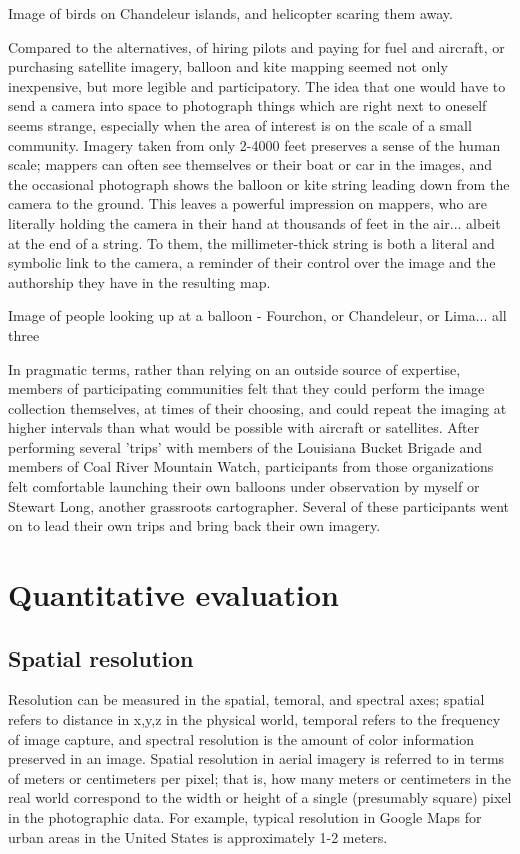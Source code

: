 \documentclass[11pt]{report}
\begin{document}
Image of birds on Chandeleur islands, and helicopter scaring them away.  

Compared to the alternatives, of hiring pilots and paying for fuel and aircraft, or purchasing satellite imagery, balloon and kite mapping seemed not only inexpensive, but more legible and participatory. The idea that one would have to send a camera into space to photograph things which are right next to oneself seems strange, especially when the area of interest is on the scale of a small community. Imagery taken from only 2-4000 feet preserves a sense of the human scale; mappers can often see themselves or their boat or car in the images, and the occasional photograph shows the balloon or kite string leading down from the camera to the ground. This leaves a powerful impression on mappers, who are literally holding the camera in their hand at thousands of feet in the air... albeit at the end of a string. To them, the millimeter-thick string is both a literal and symbolic link to the camera, a reminder of their control over the image and the authorship they have in the resulting map.  

Image of people looking up at a balloon - Fourchon, or Chandeleur, or Lima... all three

In pragmatic terms, rather than relying on an outside source of expertise, members of participating communities felt that they could perform the image collection themselves, at times of their choosing, and could repeat the imaging at higher intervals than what would be possible with aircraft or satellites. After performing several 'trips' with members of the Louisiana Bucket Brigade and members of Coal River Mountain Watch, participants from those organizations felt comfortable launching their own balloons under observation by myself or Stewart Long, another grassroots cartographer. Several of these participants went on to lead their own trips and bring back their own imagery.

\section{Quantitative evaluation}


\subsection{Spatial resolution}

Resolution can be measured in the spatial, temoral, and spectral axes; spatial refers to distance in x,y,z in the physical world, temporal refers to the frequency of image capture, and spectral resolution is the amount of color information preserved in an image. Spatial resolution in aerial imagery is referred to in terms of meters or centimeters per pixel; that is, how many meters or centimeters in the real world correspond to the width or height of a single (presumably square) pixel in the photographic data. For example, typical resolution in Google Maps for urban areas in the United States is approximately 1-2 meters. 
 
\end{document}
